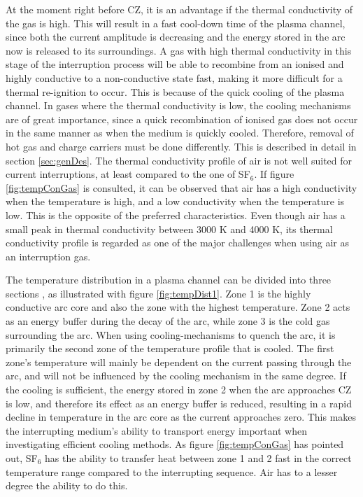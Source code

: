 \documentclass[10pt,b5paper,twoside]{article}
\begin{document}
At the moment right before CZ, it is an advantage if the thermal conductivity of the gas is high. This will result in a fast cool-down time of the plasma channel, since both the current amplitude is decreasing and the energy stored in the arc now is released to its surroundings. A gas with high thermal conductivity in this stage of the interruption process will be able to recombine from an ionised and highly conductive to a non-conductive state fast, making it more difficult for a thermal re-ignition to occur. This is because of the quick cooling of the plasma channel. In gases where the thermal conductivity is low, the cooling mechanisms are of great importance, since a quick recombination of ionised gas does not occur in the same manner as when the medium is quickly cooled. Therefore, removal of hot gas and charge carriers must be done differently. This is described in detail in section \ref{sec:genDes}. The thermal conductivity profile of air is not well suited for current interruptions, at least compared to the one of SF$_6$. If figure \ref{fig:tempConGas} is consulted, it can be observed that air has a high conductivity when the temperature is high, and a low conductivity when the temperature is low. This is the opposite of the preferred characteristics. Even though air has a small peak in thermal conductivity between 3000 K and 4000 K, its thermal conductivity profile is regarded as one of the major challenges when using air as an interruption gas. 

The temperature distribution in a plasma channel can be divided into three sections \cite{bib:TDCIGBB}, as illustrated with figure \ref{fig:tempDist1}. Zone 1 is the highly conductive arc core and also the zone with the highest temperature. Zone 2 acts as an energy buffer during the decay of the arc, while zone 3 is the cold gas surrounding the arc. When using cooling-mechanisms to quench the arc, it is primarily the second zone of the temperature profile that is cooled. The first zone's temperature will mainly be dependent on the current passing through the arc, and will not be influenced by the cooling mechanism in the same degree. If the cooling is sufficient, the energy stored in zone 2 when the arc approaches CZ is low, and therefore its effect as an energy buffer is reduced, resulting in a rapid decline in temperature in the arc core as the current approaches zero. This makes the interrupting medium's ability to transport energy important when investigating efficient cooling methods. As figure \ref{fig:tempConGas} has pointed out, SF$_6$ has the ability to transfer heat between zone 1 and 2 fast in the correct temperature range compared to the interrupting sequence. Air has to a lesser degree the ability to do this.
\end{document}
